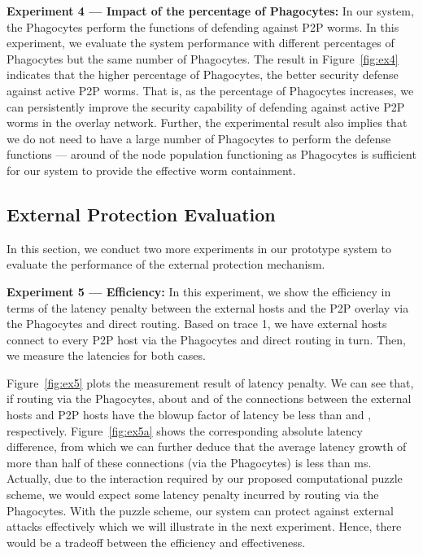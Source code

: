 \documentclass[times,10pt,twocolumn]{article}
\begin{document}
\textbf{Experiment 4 --- Impact of the percentage of Phagocytes:} In
our system, the Phagocytes perform the functions of defending
against P2P worms. In this experiment, we evaluate the system
performance with different percentages of Phagocytes but the same
number of Phagocytes. The result in Figure~\ref{fig:ex4} indicates
that the higher percentage of Phagocytes, the better security
defense against active P2P worms. That is, as the percentage of
Phagocytes increases, we can persistently improve the security
capability of defending against active P2P worms in the overlay
network. Further, the experimental result also implies that we do
not need to have a large number of Phagocytes to perform the defense
functions
--- around  of the node population functioning as Phagocytes
is sufficient for our system to provide the effective worm
containment.




\subsection{External Protection Evaluation}




In this section, we conduct two more experiments in our prototype
system to evaluate the performance of the external protection
mechanism.




\textbf{Experiment 5 --- Efficiency:} In this experiment, we show
the efficiency in terms of the latency penalty between the external
hosts and the P2P overlay via the Phagocytes and direct routing.
Based on trace 1, we have  external hosts connect to every P2P
host via the Phagocytes and direct routing in turn. Then, we measure
the latencies for both cases.



Figure~\ref{fig:ex5} plots the measurement result of latency
penalty. We can see that, if routing via the Phagocytes, about
 and  of the connections between the external hosts and
P2P hosts have the blowup factor of latency be less than  and
, respectively. Figure~\ref{fig:ex5a} shows the corresponding
absolute latency difference, from which we can further deduce that
the average latency growth of more than half of these connections
(via the Phagocytes) is less than ms. Actually, due to the
interaction required by our proposed computational puzzle scheme, we
would expect some latency penalty incurred by routing via the
Phagocytes. With the puzzle scheme, our system can protect against
external attacks effectively which we will illustrate in the next
experiment. Hence, there would be a tradeoff between the efficiency
and effectiveness.
\end{document}
